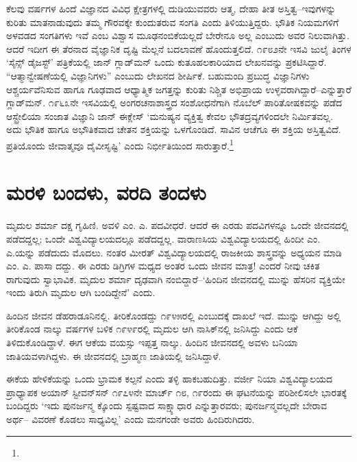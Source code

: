 ಕೆಲವು ವರ್ಷಗಳ ಹಿಂದೆ ವಿಜ್ಞಾನದ ವಿವಿಧ ಕ್ಷೇತ್ರಗಳಲ್ಲಿ ದುಡಿಯುವವರು ಆತ್ಮ, ದೇಹಾ ತೀತ ಅಸ್ತಿತ್ವ–ಇವುಗಳನ್ನು ಕುರಿತು ಮಾತನಾಡುವುದು ತಮ್ಮ ಗೌರವಕ್ಕೇ ಕುಂದುತರುವ ಸಂಗತಿ ಎಂದು ತಿಳಿಯುತ್ತಿದ್ದರು. ಭೌತಿಕ ನಿಯಮಗಳಿಗೆ ಅಳವಡದ ಸಂಗತಿಗಳು ಇವೆ ಎಂಬ ವಿಶ್ವಾಸ ಮೂಢನಂಬಿಕೆಯಲ್ಲದೆ ಬೇರೇನೂ ಅಲ್ಲ ಎಂಬುದು ಅವರ ನಿಲುವಾಗಿತ್ತು. ಆದರೆ ಇದೀಗ ಈ ತೆರನಾದ ವೈಜ್ಞಾನಿಕ ದೃಷ್ಟಿ ಮೆಲ್ಲನೆ ಬದಲಾವಣೆ ಹೊಂದುತ್ತಲಿದೆ. ೧೯೮೨ನೇ ಇಸವಿ ಜುಲೈ ತಿಂಗಳ ‘ಸೈನ್ಸ್ ಡೈಜಸ್ಟ್​’ ಪತ್ರಿಕೆಯಲ್ಲಿ ಜಾನ್ ಗ್ಲಾಡ್​ಮನ್ ಒಂದು ಕುತೂಹಲಕಾರಿಯಾದ ಲೇಖನವನ್ನು ಪ್ರಕಟಿಸಿದ್ದಾರೆ. “ಆತ್ಮಾನ್ವೇಷಣೆಯಲ್ಲಿ ವಿಜ್ಞಾನಿಗಳು” ಎಂಬುದು ಲೇಖನದ ಶೀರ್ಷಿಕೆ. ಬಹುಮಂದಿ ಪ್ರಬುದ್ಧ ವಿಜ್ಞಾನಿಗಳು ಆಶ್ಚರ್ಯವೆನಿಸುವ ಹಾಗೂ ಗೂಢವಾದ ಆಧ್ಯಾತ್ಮಿಕ ಜಗತ್ತನ್ನು ಕುರಿತು ನಿಶ್ಚಿತ ಅಭಿಪ್ರಾಯ ಉಳ್ಳವರಾಗಿದ್ದಾರೆ–ಎನ್ನುತ್ತಾರೆ ಗ್ಲಾಡ್​ಮನ್. ೧೯೬೩ನೇ ಇಸವಿಯಲ್ಲಿ ಅಂಗರಚನಾಶಾಸ್ತ್ರದ ಸಂಶೋಧನೆಗಾಗಿ ನೊಬೆಲ್ ಪಾರಿತೋಷಕವನ್ನು ಪಡೆದ ಆಸ್ಟ್ರೇಲಿಯಾ ಸಂಜಾತ ವಿಜ್ಞಾನಿ ಜಾನ್ ಈಕ್ಲೇಸ್ ‘ಮನುಷ್ಯನ ವ್ಯಕ್ತಿತ್ವ ಕೇವಲ ಭೌತದ್ರವ್ಯಗಳಿಂದಲೇ ನಿರ್ಮಿತವಲ್ಲ. ಅದು ಭೌತಿಕ ಹಾಗೂ ಅಭೌತಿಕವಾದ ಚೇತನ ಶಕ್ತಿಯನ್ನು ಒಳಗೊಂಡಿದೆ. ಸಾವಿನ ಆಚೆಗೂ ಈ ಶಕ್ತಿಯ ಅಸ್ತಿತ್ವವಿದೆ. ಪ್ರತಿಯೊಂದು ಜೀವಾತ್ಮವೂ ದೈವೀಸೃಷ್ಟಿ’ ಎಂದು ನಿರ್ಭೀತಿಯಿಂದ ಸಾರುತ್ತಾರೆ.\footnote{}


\section{ಮರಳಿ ಬಂದಳು, ವರದಿ ತಂದಳು}

ಮೃದುಲ ಶರ್ಮಾ ದಕ್ಷ ಗೃಹಿಣಿ. ಅವಳಿ ಎಂ. ಎ. ಪದವೀಧರೆ. ಆದರೆ ಈ ಎರಡು ಪದವಿಗಳನ್ನೂ ಒಂದೇ ಜೀವನದಲ್ಲಿ ಪಡೆದದ್ದಲ್ಲ; ಒಂದೇ ವಿಶ್ವವಿದ್ಯಾಲಯದಲ್ಲೂ ಪಡೆದದ್ದಲ್ಲ. ವಾರಾಣಸಿಯ ವಿಶ್ವವಿದ್ಯಾಲಯದಲ್ಲಿ ಹಿಂದೀ ಎಂ. ಎ.ಯನ್ನು ಪಡೆದುದು ಮೊದಲು. ನಂತರ ಮೀರತ್ ವಿಶ್ವವಿದ್ಯಾಲಯದಲ್ಲಿ ರಾಜಕೀಯ ಶಾಸ್ತ್ರವನ್ನು ಅಧ್ಯಯನ ಮಾಡಿ ಎಂ. ಎ. ಪಾಸಾ ದದ್ದು. ಈ ಎರಡು ಡಿಗ್ರಿಗಳ ಮಧ್ಯದ ಅಂತರ ಒಂದು ಜೀವನ ಮಾತ್ರ! ಎಂದರೆ ನೀವು ಚಕಿತ ರಾಗುವುದು ಸ್ವಾಭಾವಿಕ. ಮೃದುಲ ಶರ್ಮಾ ದೃಢವಾಗಿ ನಂಬಿದ್ದಾರೆ–‘ಹಿಂದಿನ ಜೀವನದಲ್ಲಿ ಮುನ್ನು ಹೆಸರಿನ ವ್ಯಕ್ತಿಯೇ ಇಂದು ತಿರುಗಿ ಮೃದುಲ ಆಗಿ ಬಂದಿದ್ದೇನೆ’ ಎಂದು.

ಹಿಂದಿನ ಜೀವನ ಡೆಹರಾಡೂನಿನಲ್ಲಿ. ತೀರಿಕೊಂಡದ್ದು ೧೯೪೫ರಲ್ಲಿ ಎಂಬುದಕ್ಕೆ ದಾಖಲೆ ಇದೆ. ಮುನ್ನು ಆಗಿದ್ದು ಅಲ್ಲಿ ತೀರಿಕೊಂಡ ನಾಲ್ಕು ವರ್ಷಗಳ ಬಳಿಕ ೧೯೪೯ರಲ್ಲಿ ಮೃದುಲ ಆಗಿ ನಾಸಿಕ್​ನಲ್ಲಿ ಜನಿಸಿದ್ದು ಎಂದು ಆಕೆ ತಿಳಿದುಕೊಂಡಿದ್ದಾಳೆ. ಈಗ ಆಕೆಯ ವಯಸ್ಸು ಇಪ್ಪತ್ತ ನಾಲ್ಕು. ಹಿಂದಿನ ಜೀವನದಲ್ಲಿ ಅವಳು ಬನಿಯಾ ಜಾತಿಯವಳಾಗಿದ್ದಳು. ಈ ಜೀವನದಲ್ಲಿ ಬ್ರಾಹ್ಮಣ ಜಾತಿಯಲ್ಲಿ ಜನಿಸಿದ್ದಾಳೆ.

ಈಕೆಯ ಹೇಳಿಕೆಯನ್ನು ಒಂದು ಭ್ರಾಮಕ ಕಲ್ಪನೆ ಎಂದು ತಳ್ಳಿ ಹಾಕಬಹುದಿತ್ತು. ವರ್ಜೀ ನಿಯಾ ವಿಶ್ವವಿದ್ಯಾಲಯದ ಪ್ರಾಧ್ಯಾಪಕ ಅಯಾನ್ ಸ್ಟೀವನ್​ಸನ್ ೧೯೭೪ನೇ ಮಾರ್ಚ್ ೧೮, ೧೯ರಂದು ಈ ಘಟನೆಯನ್ನು ಪರಿಶೀಲಿಸಲೇ ಭಾರತಕ್ಕೆ ಬಂದಿದ್ದರು ‘ಇದು ಪುನರ್ಜನ್ಮ ಕ್ಕೊಂದು ಸ್ಪಷ್ಟವಾದ ಸಾಕ್ಷ್ಯಾಧಾರ ಎನ್ನುತ್ತಾರವರು; ಪುನರ್ಜನ್ಮವಲ್ಲದೇ ಬೇರಾವ ಅರ್ಥ– ವಿವರಣೆ ಕೊಡಲು ಸಾಧ್ಯವಿಲ್ಲ’ ಎಂದು ಮನಗಂಡೇ ಅವರು ಹಿಂದಿರುಗಿದರು.

